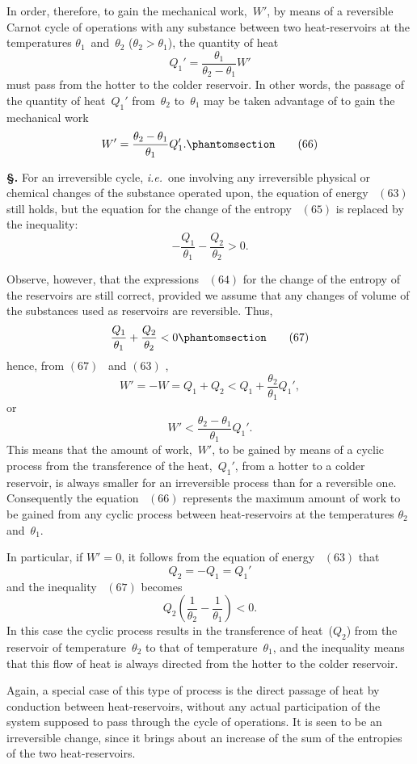 \documentclass[12pt]{book}[2005/09/16]
\newcommand{\Chg}[2]{#2}
\newcommand{\Add}[1]{\Chg{}{#1}}
\newcommand{\Section}[1]{
  \medskip\par\textbf{§\;#1}
  \label{section:#1}
}
\newcommand{\Tag}[1]{%
  \phantomsection\label{eqn:#1}\tag*{\ensuremath{#1}}%
}
\newcommand{\Eq}[1]{%
  \hyperref[eqn:#1]{\ensuremath{#1}}%
}
\newcommand{\PageSep}[1]{\ignorespaces}
\newcommand{\ie}{\emph{i.e.}}
\begin{document}
In order, therefore, to gain the mechanical work,~$W'$,
by means of a reversible Carnot cycle of operations with
any substance between two heat-reservoirs at the temperatures
$\theta_{1}$~and~$\theta_{2}$ ($\theta_{2} > \theta_{1}$), the quantity of heat
\[
Q_{1}' = \frac{\theta_{1}}{\theta_{2} - \theta_{1}} W'
\]
must pass from the hotter to the colder reservoir. In
other words, the passage of the quantity of heat~$Q_{1}'$ from~$\theta_{2}$
to~$\theta_{1}$ may be taken advantage of to gain the mechanical
work
\[
W' = \frac{\theta_{2} - \theta_{1}}{\theta_{1}} Q_{1}'\Add{.}
\Tag{(66)}
\]

\Section{138.} For an irreversible cycle, \ie\ one involving any
irreversible physical or chemical changes of the substance
operated upon, the equation of energy~\Eq{(63)} still holds, but
the equation for the change of the entropy~\Eq{(65)} is replaced
by the inequality:
\[
- \frac{Q_{1}}{\theta_{1}} - \frac{Q_{2}}{\theta_{2}} > 0.
\]

Observe, however, that the expressions~\Eq{(64)} for the
change of the entropy of the reservoirs are still correct,
provided we assume that any changes of volume of the
substances used as reservoirs are reversible. Thus,
\[
\frac{Q_{1}}{\theta_{1}} + \frac{Q_{2}}{\theta_{2}} < 0
\Tag{(67)}
\]
hence, from \Eq{(67)}~and \Eq{(63)},
\[
W' = -W = Q_{1} + Q_{2} < Q_{1} + \frac{\theta_{2}}{\theta_{1}} Q_{1}'\Add{,}
\]
or
\[
W' < \frac{\theta_{2} - \theta_{1}}{\theta_{1}} Q_{1}'.
\]
\PageSep{107}
This means that the amount of work,~$W'$, to be gained by
means of a cyclic process from the transference of the heat,~$Q_{1}'$,
from a hotter to a colder reservoir, is always smaller
for an irreversible process than for a reversible one. Consequently
the equation~\Eq{(66)} represents the maximum amount
of work to be gained from any cyclic process between heat-reservoirs
at the temperatures $\theta_{2}$ and~$\theta_{1}$.

In particular, if $W' = 0$, it follows from the equation of
energy~\Eq{(63)} that
\[
Q_{2} = -Q_{1} = Q_{1}'
\]
and the inequality~\Eq{(67)} becomes
\[
Q_{2} \left(\frac{1}{\theta_{2}} - \frac{1}{\theta_{1}}\right) < 0.
\]
In this case the cyclic process results in the transference
of heat~($Q_{2}$) from the reservoir of temperature~$\theta_{2}$ to that of
temperature~$\theta_{1}$, and the inequality means that this flow
of heat is always directed from the hotter to the colder
reservoir.

Again, a special case of this type of process is the direct
passage of heat by conduction between heat-reservoirs, without
any actual participation of the system supposed to pass
through the cycle of operations. It is seen to be an irreversible
change, since it brings about an increase of the
sum of the entropies of the two heat-reservoirs.
\end{document}
